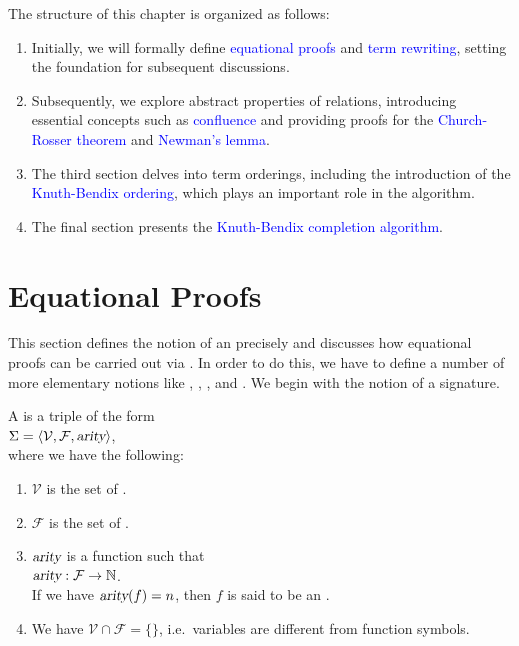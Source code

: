 The structure of this chapter is organized as follows:
\begin{enumerate}
\item Initially, we will formally define \textcolor{blue}{equational proofs} and \textcolor{blue}{term
      rewriting}, setting the foundation for subsequent discussions. 
\item Subsequently, we explore abstract properties of relations, introducing essential concepts such as
      \textcolor{blue}{confluence} and providing proofs for the \textcolor{blue}{Church-Rosser theorem} and
      \textcolor{blue}{Newman's lemma}. 
\item The third section delves into term orderings, including the introduction of the
      \textcolor{blue}{Knuth-Bendix ordering}, which plays an important role in the algorithm. 
\item The final section presents the \textcolor{blue}{Knuth-Bendix completion algorithm}. 
\end{enumerate}

\section{Equational Proofs}
This section defines the notion of an  precisely and discusses how equational proofs can
be carried out via .  In order to do this, we have to define a number of more elementary
notions like , , , and .  We begin with 
the notion of a signature.

\begin{Definition}[Signature]
  A   is a triple of the form
  \\[0.2cm]
  \hspace*{1.3cm} $\Sigma = \langle \mathcal{V}, \mathcal{F}, \textsl{arity} \rangle$,
  \\[0.2cm]
  where we have the following: 
  \begin{enumerate}
  \item $\mathcal{V}$ is the set of . 
  \item $\mathcal{F}$ is the set of . 
  \item $\textsl{arity}$ is a function such that
        \\[0.2cm]
        \hspace*{1.3cm}
        $\textsl{arity}: \mathcal{F} \rightarrow \mathbb{N}$.
        \\[0.2cm]
        If we have $\textsl{arity}(f) = n$, then $f$ is said to be an .
  \item We have $\mathcal{V} \cap \mathcal{F} = \{\}$, i.e.~variables are different from function symbols. \eoxs
  \end{enumerate}
\end{Definition}

